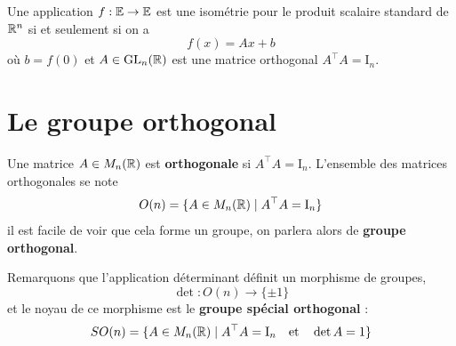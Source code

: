 
\begin{proposition}
	Une application $f : \mathbb E \to \mathbb E$ est une isométrie pour le produit scalaire standard de $\mathbb{R}^n$ si et seulement si on a
	\[
	f(x) = Ax + b
	\]
	où $b = f(0)$ et $A \in \operatorname{GL}_n(\mathbb{R})$ est une matrice orthogonal $A^\top A = \mathrm I_n$.
\end{proposition}


\section{Le groupe orthogonal}

\begin{definition} \label{def: Groupe orthogonal}
	Une matrice $A \in M_n(\mathbb{R})$ est \textbf{orthogonale} si $A^\top A = \mathrm I_n$. L'ensemble des matrices orthogonales se note
	\[
	O(n) = \{ A \in M_n(\mathbb{R}) \mid A^\top A = \mathrm I_n\}
	\]
	il est facile de voir que cela forme un groupe, on parlera alors de \textbf{groupe orthogonal}.
\end{definition}

Remarquons que l'application déterminant définit un morphisme de groupes,
\[
\det : O(n) \to \{\pm 1\}
\]
et le noyau de ce morphisme est le \textbf{groupe spécial orthogonal} :
\[
SO(n) = \{ A \in M_n(\mathbb{R}) \mid A^\top A = \mathrm I_n \quad \text{et} \quad \det A = 1\}
\]


